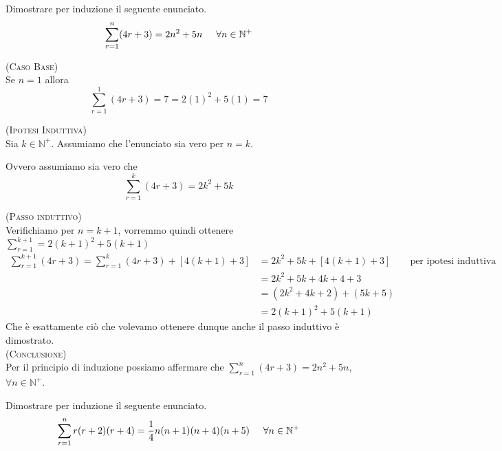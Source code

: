 \begin{esercizio}
Dimostrare per induzione il seguente enunciato.
$$\sum\limits_{r=1}^{n} (4r+3) = 2n^2+5n \hspace{.5cm} \forall n \in \mathbb{N}^+$$
\end{esercizio}

\begin{soluzione}
\textsc{(Caso Base)}\\
Se $n = 1$ allora $$\sum\limits_{r=1}^{1} (4r+3) = 7 =  2(1)^2+5(1) = 7$$


\textsc{(Ipotesi Induttiva)}\\
Sia $k \in \mathbb{N}^+$.  Assumiamo che l'enunciato sia vero per $n = k$.  
		
Ovvero assumiamo sia vero che $$\sum\limits_{r=1}^{k} (4r+3) = 2k^2+5k$$
		
\textsc{(Passo induttivo)}\\
Verifichiamo per $n = k+1$, vorremmo quindi ottenere $\sum_{r=1}^{k+1}=2(k+1)^2+5(k+1)$
		\begin{align*}
		\sum\limits_{r=1}^{k+1} (4r+3)  = \sum\limits_{r=1}^{k} (4r+3) + [4(k+1)+3] & = 2k^2+5k+ [4(k+1)+3] \qquad \text{per ipotesi induttiva}\\
		& = 2k^2 + 5k + 4k + 4 + 3\\
		& = (2k^2 +4k+2) + (5k+5)\\
		& = 2(k+1)^2 + 5(k+1)
		\end{align*}
Che è esattamente ciò che volevamo ottenere dunque anche il passo induttivo è dimostrato.\\

\textsc{(Conclusione)}\\
Per il principio di induzione possiamo affermare che $\sum\limits_{r=1}^{n} (4r+3) = 2n^2+5n$, $\forall n \in \mathbb{N}^+$.\\
\end{soluzione}


\begin{esercizio}
Dimostrare per induzione il seguente enunciato.
$$\sum\limits_{r=1}^{n} r(r+2)(r+4) = \frac{1}{4}n(n+1)(n+4)(n+5)\hspace{.5cm} \forall n \in \mathbb{N}^+$$
\end{esercizio}

